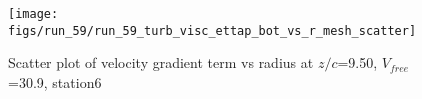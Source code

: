 \begin{figure}[H]
\centering
\texttt{[image: figs/run\_59/run\_59\_turb\_visc\_ettap\_bot\_vs\_r\_mesh\_scatter]}
\caption{Scatter plot of velocity gradient term vs radius at $z/c$=9.50, $V_{free}$=30.9, station6}
\label{fig:run_59_turb_visc_ettap_bot_vs_r_mesh_scatter}
\end{figure}


